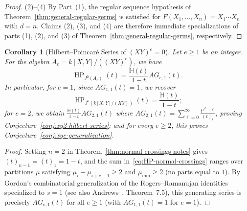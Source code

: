 \documentclass[a4paper, 12pt]{amsart}
\newtheorem{corollary}[theorem]{Corollary}
\theoremstyle{remark}
\begin{document}
\begin{proof}
(2)–(4) By Part~(1),
the regular sequence hypothesis of Theorem~\ref{thm:general-regular-germs} is satisfied for $F(X_1, \dots, X_n) = X_1 \cdots X_n$ with $d = n$.
Claims (2), (3), and (4) are therefore immediate specializations of parts (1), (2), and (3) of Theorem~\ref{thm:general-regular-germs},
respectively.
\end{proof}

\begin{corollary}[Hilbert--Poincaré Series of $(XY)^e = 0$]
\label{cor:proof-xye-notes}
Let $e \ge 1$ be an integer.
For the algebra $A_e = k[X, Y] / ((XY)^e)$,
we have
\begin{equation}
  \operatorname{HP}_{J^0(A_e)}(t) = \frac{\mathbb{H}(t)}{1 - t} AG_{e, 1}(t).
\end{equation}
In particular,
for $e = 1$,
since $AG_{1, 1}(t) = 1$,
we recover
\begin{equation}
  \operatorname{HP}_{J^0(k[X, Y] / (XY))}(t) = \frac{\mathbb{H}(t)}{1 - t};
\end{equation}
for $e = 2$,
we obtain $\frac{\mathbb{H}(t)}{1 - t} AG_{2, 1}(t)$ where $AG_{2, 1}(t) = \sum_{\ell = 0}^\infty \frac{t^{\ell^2 + \ell}}{(t)_\ell}$,
proving Conjecture~\ref{conj:xy2-hilbert-series};
and for every $e \ge 2$,
this proves Conjecture~\ref{conj:xye-generalization}.
\end{corollary}

\begin{proof}
Setting $n = 2$ in Theorem~\ref{thm:normal-crossings-notes} gives $(t)_{n - 1} = (t)_1 = 1 - t$,
and the sum in~\eqref{eq:HP-normal-crossings} ranges over partitions $\mu$ satisfying $\mu_i - \mu_{i + e - 1} \ge 2$ and $\mu_{\mathrm{min}} \ge 2$ (no parts equal to $1$).
By Gordon's combinatorial generalization of the Rogers--Ramanujan identities~\cite{gordon_combinatorial_1961} specialized to $s = 1$
(see also Andrews~\cite{andrews_partitions_1976}, Theorem~7.5),
this generating series is precisely $AG_{e, 1}(t)$ for all $e \ge 1$
(with $AG_{1, 1}(t) = 1$ for $e = 1$).
\end{proof}
\end{document}
